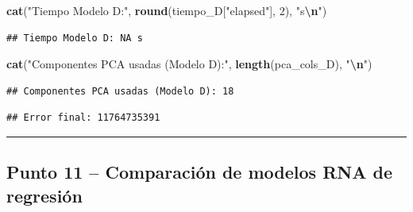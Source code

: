 \documentclass[
]{article}
\newenvironment{Shaded}{\begin{snugshade}}{\end{snugshade}}
\newcommand{\DecValTok}[1]{\textcolor[rgb]{0.00,0.00,0.81}{#1}}
\newcommand{\FunctionTok}[1]{\textcolor[rgb]{0.13,0.29,0.53}{\textbf{#1}}}
\newcommand{\NormalTok}[1]{#1}
\newcommand{\SpecialCharTok}[1]{\textcolor[rgb]{0.81,0.36,0.00}{\textbf{#1}}}
\newcommand{\StringTok}[1]{\textcolor[rgb]{0.31,0.60,0.02}{#1}}
\begin{document}
\begin{Shaded}
\begin{Highlighting}[]
\FunctionTok{cat}\NormalTok{(}\StringTok{"Tiempo Modelo D:"}\NormalTok{, }\FunctionTok{round}\NormalTok{(tiempo\_D[}\StringTok{"elapsed"}\NormalTok{], }\DecValTok{2}\NormalTok{), }\StringTok{"s}\SpecialCharTok{\textbackslash{}n}\StringTok{"}\NormalTok{)}
\end{Highlighting}
\end{Shaded}

\begin{verbatim}
## Tiempo Modelo D: NA s
\end{verbatim}

\begin{Shaded}
\begin{Highlighting}[]
\FunctionTok{cat}\NormalTok{(}\StringTok{"Componentes PCA usadas (Modelo D):"}\NormalTok{, }\FunctionTok{length}\NormalTok{(pca\_cols\_D), }\StringTok{"}\SpecialCharTok{\textbackslash{}n}\StringTok{"}\NormalTok{)}
\end{Highlighting}
\end{Shaded}

\begin{verbatim}
## Componentes PCA usadas (Modelo D): 18
\end{verbatim}

\begin{Shaded}
\end{Shaded}

\begin{verbatim}
## Error final: 11764735391
\end{verbatim}

\begin{center}\rule{0.5\linewidth}{0.5pt}\end{center}

\hypertarget{punto-11-comparaciuxf3n-de-modelos-rna-de-regresiuxf3n}{%
\subsection{Punto 11 -- Comparación de modelos RNA de
regresión}\label{punto-11-comparaciuxf3n-de-modelos-rna-de-regresiuxf3n}}
\end{document}
